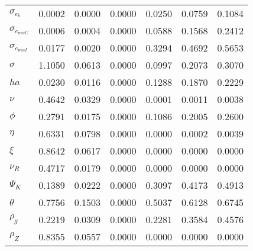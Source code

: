 \begin{center}
\begin{longtable}{lcccccc}
$ \sigma_{{e_b}}       $	 & 	          0.0002	 & 	          0.0000	 & 	          0.0000	 & 	          0.0250	 & 	          0.0759	 & 	          0.1084 \\ 
$ \sigma_{{e_{muC}}}   $	 & 	          0.0006	 & 	          0.0004	 & 	          0.0000	 & 	          0.0588	 & 	          0.1568	 & 	          0.2412 \\ 
$ \sigma_{{e_{muI}}}   $	 & 	          0.0177	 & 	          0.0020	 & 	          0.0000	 & 	          0.3294	 & 	          0.4692	 & 	          0.5653 \\ 
$ {\sigma}             $	 & 	          1.1050	 & 	          0.0613	 & 	          0.0000	 & 	          0.0997	 & 	          0.2073	 & 	          0.3070 \\ 
$ {ha}                 $	 & 	          0.0230	 & 	          0.0116	 & 	          0.0000	 & 	          0.1288	 & 	          0.1870	 & 	          0.2229 \\ 
$ \nu                  $	 & 	          0.4642	 & 	          0.0329	 & 	          0.0000	 & 	          0.0001	 & 	          0.0011	 & 	          0.0038 \\ 
$ {\phi}               $	 & 	          0.2791	 & 	          0.0175	 & 	          0.0000	 & 	          0.1086	 & 	          0.2005	 & 	          0.2600 \\ 
$ {\eta}               $	 & 	          0.6331	 & 	          0.0798	 & 	          0.0000	 & 	          0.0000	 & 	          0.0002	 & 	          0.0039 \\ 
$ \xi                  $	 & 	          0.8642	 & 	          0.0617	 & 	          0.0000	 & 	          0.0000	 & 	          0.0000	 & 	          0.0000 \\ 
$ {\nu_R}              $	 & 	          0.4717	 & 	          0.0179	 & 	          0.0000	 & 	          0.0000	 & 	          0.0000	 & 	          0.0000 \\ 
$ {\Psi_{K}}           $	 & 	          0.1389	 & 	          0.0222	 & 	          0.0000	 & 	          0.3097	 & 	          0.4173	 & 	          0.4913 \\ 
$ {\theta}             $	 & 	          0.7756	 & 	          0.1503	 & 	          0.0000	 & 	          0.5037	 & 	          0.6128	 & 	          0.6745 \\ 
$ {\rho_g}             $	 & 	          0.2219	 & 	          0.0309	 & 	          0.0000	 & 	          0.2281	 & 	          0.3584	 & 	          0.4576 \\ 
$ {\rho_Z}             $	 & 	          0.8355	 & 	          0.0557	 & 	          0.0000	 & 	          0.0000	 & 	          0.0000	 & 	          0.0000 \\ 

\end{longtable}
\end{center}

